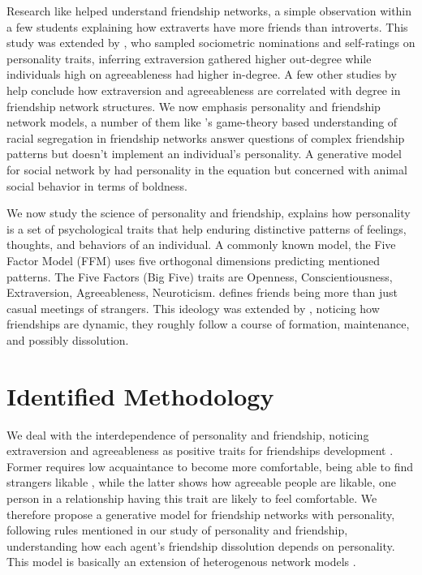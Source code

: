 \documentclass[runningheads]{llncs}
\begin{document}
Research like \cite{ref_4} helped understand friendship networks, a simple observation within a few students explaining how extraverts have more friends than introverts. This study was extended by \cite{ref_5}, who sampled sociometric nominations and self-ratings on personality traits, inferring extraversion gathered higher out-degree while individuals high on agreeableness had higher in-degree. A few other studies by \cite{ref_6,ref_7,ref_8,ref_9,ref_10} help conclude how extraversion and agreeableness are correlated with degree in friendship network structures. We now emphasis personality and friendship network models, a number of them like \cite{ref_12}’s game-theory based understanding of racial segregation in friendship networks answer questions of complex friendship patterns but doesn’t implement an individual’s personality. A generative model for social network by \cite{ref_13} had personality in the equation but concerned with animal social behavior in terms of boldness.

We now study the science of personality and friendship, \cite{ref_17} explains how personality is a set of psychological traits that help enduring distinctive patterns of feelings, thoughts, and behaviors of an individual. A commonly known model, the Five Factor Model (FFM) uses five orthogonal dimensions predicting mentioned patterns. The Five Factors (Big Five) traits are Openness, Conscientiousness, Extraversion, Agreeableness, Neuroticism. \cite{ref_20} defines friends being more than just casual meetings of strangers. This ideology was extended by \cite{ref_21}, noticing how friendships are dynamic, they roughly follow a course of formation, maintenance, and possibly dissolution.

\section{Identified Methodology}
We deal with the interdependence of personality and friendship, noticing extraversion and agreeableness as positive traits for friendships development \cite{ref_16}. Former requires low acquaintance to become more comfortable, being able to find strangers likable \cite{ref_22}, while the latter shows how agreeable people are likable, one person in a relationship having this trait are likely to feel comfortable. We therefore propose a generative model for friendship networks with personality, following rules mentioned in our study of personality and friendship, understanding how each agent’s friendship dissolution depends on personality. This model is basically an extension of heterogenous network models \cite{ref_24}.
\end{document}
